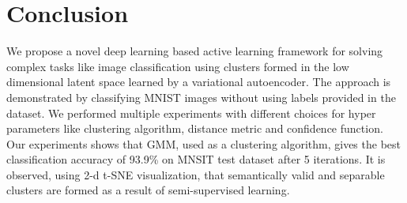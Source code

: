 \documentclass[runningheads]{llncs}
\begin{document}
\section{Conclusion}
We propose a novel deep learning based active learning framework for solving complex tasks like image classification using clusters formed in the low dimensional latent space learned by a variational autoencoder.
The approach is demonstrated by classifying MNIST images without using labels provided in the dataset.
We performed multiple experiments with different choices for hyper parameters like clustering algorithm, distance metric and confidence function.
Our experiments shows that GMM, used as a clustering algorithm,  gives the best classification accuracy of 93.9\% on MNSIT test dataset after 5 iterations.
It is observed, using 2-d t-SNE visualization, that  semantically valid and separable clusters are formed as a result of semi-supervised learning.
%
%
%

%
\end{document}

